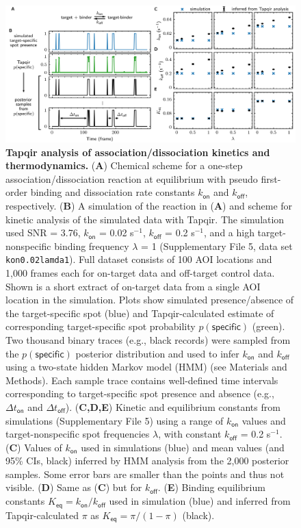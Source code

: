 \begin{figure}
\begin{fullwidth}
\includegraphics[width=183mm]{figures/kinetic_analysis.png}
\caption{\textbf{Tapqir analysis of association/dissociation kinetics and thermodynamics.} (\textbf{A}) Chemical scheme for a one-step association/dissociation reaction at equilibrium with pseudo first-order binding and dissociation rate constants $k_{\mathsf{on}}$ and $k_{\mathsf{off}}$, respectively. (\textbf{B}) A simulation of the reaction in (\textbf{A}) and scheme for kinetic analysis of the simulated data with Tapqir. The simulation used SNR = 3.76, $k_\mathsf{on}$ = 0.02 s$^{-1}$, $k_\mathsf{off}$ = 0.2 s$^{-1}$, and a high target-nonspecific binding frequency $\lambda$ = 1 (Supplementary File 5, data set \texttt{kon0.02lamda1}). Full dataset consists of 100 AOI locations and 1,000 frames each for on-target data and off-target control data. Shown is a short extract of on-target data from a single AOI location in the simulation.  Plots show simulated presence/absence of the target-specific spot (blue) and Tapqir-calculated estimate of corresponding target-specific spot probability $p(\mathsf{specific})$ (green). Two thousand binary traces (e.g., black records) were sampled from the $p(\mathsf{specific})$ posterior distribution and used to infer $k_\mathsf{on}$ and $k_\mathsf{off}$ using a two-state hidden Markov model (HMM) (see Materials and Methods). Each sample trace contains well-defined time intervals corresponding to target-specific spot presence and absence (e.g., $\Delta t_\mathsf{on}$ and $\Delta t_\mathsf{off}$). (\textbf{C,D,E}) Kinetic and equilibrium constants from simulations (Supplementary File 5) using a range of $k_\mathsf{on}$ values and  target-nonspecific spot frequencies $\lambda$, with constant $k_\mathsf{off}$ = 0.2 s$^{-1}$. (\textbf{C}) Values of $k_{\mathsf{on}}$ used in simulations (blue) and mean values (and 95\% CIs, black) inferred by HMM analysis from the 2,000 posterior samples.  Some error bars are smaller than the points and thus not visible. (\textbf{D}) Same as (\textbf{C}) but for $k_{\mathsf{off}}$. (\textbf{E})  Binding equilibrium constants $K_{\mathsf{eq}} = k_{\mathsf{on}} / k_{\mathsf{off}}$ used in simulation (blue) and inferred from Tapqir-calculated $\pi$ as $K_{\mathsf{eq}} = \pi / (1 - \pi)$ (black). }
\label{fig:kinetic_analysis}
\end{fullwidth}
\end{figure}